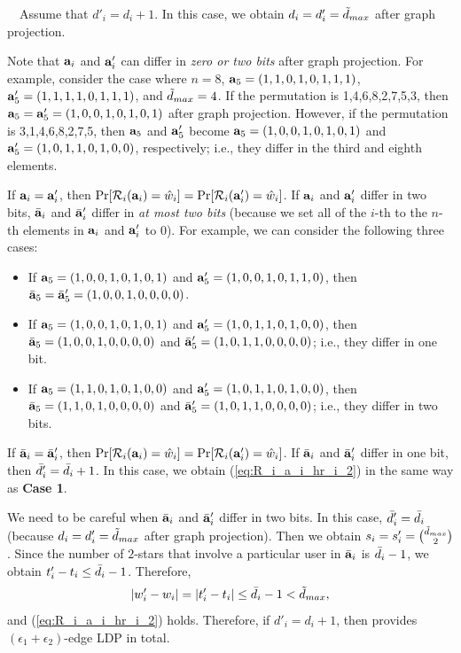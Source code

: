 {\smallskip
{}~~Assume that $d'_i = d_i + 1$. 
In this case, we obtain $d_i = d'_i = \tilde{d}_{max}$ after graph projection. 

Note that $\mathbf{a}_i$ and $\mathbf{a}'_i$ can differ in \textit{zero or two bits} after graph projection. 
For example, consider the case where $n=8$, $\mathbf{a}_5=(1,1,0,1,0,1,1,1)$, $\mathbf{a}'_5=(1,1,1,1,0,1,1,1)$, and $\tilde{d}_{max}=4$. 
If the permutation is 1,4,6,8,2,7,5,3, then $\mathbf{a}_5=\mathbf{a}'_5=(1,0,0,1,0,1,0,1)$ after graph projection. 
However, if the permutation is 3,1,4,6,8,2,7,5, then $\mathbf{a}_5$ and $\mathbf{a}'_5$ become $\mathbf{a}_5=(1,0,0,1,0,1,0,1)$ and $\mathbf{a}'_5=(1,0,1,1,0,1,0,0)$, respectively; i.e., they differ in the third and eighth elements. 

If $\mathbf{a}_i=\mathbf{a}'_i$, then $\Pr[\mathcal{R}_i(\mathbf{a}_i) = \hat{w}_i] = \Pr[\mathcal{R}_i(\mathbf{a}'_i) = \hat{w}_i]$. 
If $\mathbf{a}_i$ and $\mathbf{a}'_i$ differ in two bits, $\bar{\mathbf{a}}_i$ and $\bar{\mathbf{a}}'_i$ differ in \textit{at most two bits} (because we set all of the $i$-th to the $n$-th elements in $\mathbf{a}_i$ and $\mathbf{a}'_i$ to $0$). 
For example, we can consider the following three cases:
\begin{itemize}
    \item If $\mathbf{a}_5=(1,0,0,1,0,1,0,1)$ and $\mathbf{a}'_5=(1,0,0,1,0,1,1,0)$, then $\bar{\mathbf{a}}_5=\bar{\mathbf{a}}'_5=(1,0,0,1,0,0,0,0)$. 
    \item If $\mathbf{a}_5=(1,0,0,1,0,1,0,1)$ and $\mathbf{a}'_5=(1,0,1,1,0,1,0,0)$, then $\bar{\mathbf{a}}_5=(1,0,0,1,0,0,0,0)$ and $\bar{\mathbf{a}}'_5=(1,0,1,1, 0,0,\allowbreak0,0)$; i.e., they differ in one bit. 
    \item If $\mathbf{a}_5=(1,1,0,1,0,1,0,0)$ and $\mathbf{a}'_5=(1,0,1,1,0,1,0,0)$, then $\bar{\mathbf{a}}_5=(1,1,0,1,0,0,0,0)$ and $\bar{\mathbf{a}}'_5=(1,0,1,1,0,0,\allowbreak0,0)$; i.e., they differ in two bits.
\end{itemize}
If $\bar{\mathbf{a}}_i=\bar{\mathbf{a}}'_i$, then $\Pr[\mathcal{R}_i(\mathbf{a}_i) = \hat{w}_i] = \Pr[\mathcal{R}_i(\mathbf{a}'_i) = \hat{w}_i]$. 
If $\bar{\mathbf{a}}_i$ and $\bar{\mathbf{a}}'_i$ differ in one bit, then $\bar{d}'_i = \bar{d}_i + 1$. 
In this case, we obtain (\ref{eq:R_i_a_i_hr_i_2}) in the same way as \textbf{Case 1}. 

We need to be careful when $\bar{\mathbf{a}}_i$ and $\bar{\mathbf{a}}'_i$ differ in two bits. 
In this case, $\bar{d}'_i = \bar{d}_i$ (because $d_i = d'_i = \tilde{d}_{max}$ after graph projection). 
Then we obtain $s_i = s'_i = \binom{\tilde{d}_{max}}{2}$. 
Since the number of $2$-stars that involve a particular user in $\bar{\mathbf{a}}_i$ is $\bar{d}_i - 1$, we obtain $t'_i - t_i \leq \bar{d}_i - 1$. Therefore,
\begin{align*}
|w'_i - w_i| = |t'_i - t_i| \leq \bar{d}_i - 1 < \tilde{d}_{max},
\end{align*}
and (\ref{eq:R_i_a_i_hr_i_2}) holds. 
Therefore, if $d'_i = d_i + 1$, then 
 provides $(\epsilon_1 + \epsilon_2)$-edge LDP in total. 

}
